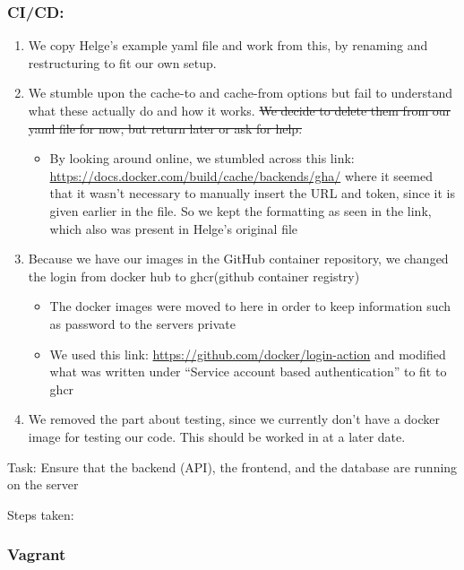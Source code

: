 \subsubsection{CI/CD:}
\label{log:cicd}

\begin{enumerate}
    \item We copy Helge's example yaml file and work from this, by renaming and restructuring to fit our own setup.
    \item We stumble upon the cache-to and cache-from options but fail to understand what these actually do and how it works. \sout{We decide to delete them from our yaml file for now, but return later or ask for help.}

    \begin{itemize}
        \item By looking around online, we stumbled across this link: \url{https://docs.docker.com/build/cache/backends/gha/} where it seemed that it wasn't necessary to manually insert the URL and token, since it is given earlier in the file. So we kept the formatting as seen in the link, which also was present in Helge's original file
    \end{itemize}
    \item Because we have our images in the GitHub container repository, we changed the login from docker hub to ghcr(github container registry)

    \begin{itemize}
        \item The docker images were moved to here in order to keep information such as password to the servers private
        \item We used this link: \url{https://github.com/docker/login-action} and modified what was written under ``Service account based authentication'' to fit to ghcr
    \end{itemize}
    \item We removed the part about testing, since we currently don't have a docker image for testing our code. This should be worked in at a later date.
\end{enumerate}

Task: Ensure that the backend (API), the frontend, and the database are
running on the server

Steps taken:

\subsubsection{Vagrant}
\label{log:vagrant}

